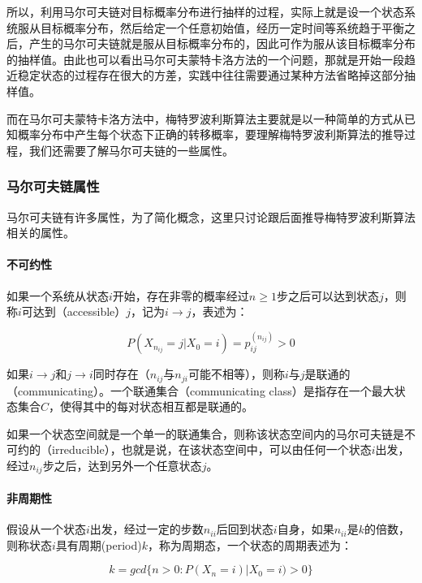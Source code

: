 所以，利用马尔可夫链对目标概率分布进行抽样的过程，实际上就是设一个状态系统服从目标概率分布，然后给定一个任意初始值，经历一定时间等系统趋于平衡之后，产生的马尔可夫链就是服从目标概率分布的，因此可作为服从该目标概率分布的抽样值。由此也可以看出马尔可夫蒙特卡洛方法的一个问题，那就是开始一段趋近稳定状态的过程存在很大的方差，实践中往往需要通过某种方法省略掉这部分抽样值。

而在马尔可夫蒙特卡洛方法中，梅特罗波利斯算法主要就是以一种简单的方式从已知概率分布中产生每个状态下正确的转移概率，要理解梅特罗波利斯算法的推导过程，我们还需要了解马尔可夫链的一些属性。




\subsubsection{马尔可夫链属性}
马尔可夫链有许多属性，为了简化概念，这里只讨论跟后面推导梅特罗波利斯算法相关的属性。


\paragraph{不可约性}
如果一个系统从状态$i$开始，存在非零的概率经过$n\geq 1$步之后可以达到状态$j$，则称$i$可达到（accessible）$j$，记为$i\rightarrow j$，表述为：

\begin{equation}
	P(X_{n_{ij}}=j|X_0=i)=p^{(n_{ij})}_{ij}>0
\end{equation}

如果$i\rightarrow j$和$j\rightarrow i$同时存在（$n_{ij}$与$n_{ji}$可能不相等），则称$i$与$j$是联通的（communicating）。一个联通集合（communicating class）是指存在一个最大状态集合$C$，使得其中的每对状态相互都是联通的。

如果一个状态空间就是一个单一的联通集合，则称该状态空间内的马尔可夫链是不可约的（irreducible），也就是说，在该状态空间中，可以由任何一个状态$i$出发，经过$n_{ij}$步之后，达到另外一个任意状态$j$。




\paragraph{非周期性}
假设从一个状态$i$出发，经过一定的步数$n_{ii}$后回到状态$i$自身，如果$n_{ii}$是$k$的倍数，则称状态$i$具有周期(period)$k$，称为周期态，一个状态的周期表述为：

\begin{equation}
	k=gcd\{n>0:P(X_n=i)|X_0=i)>0\}
\end{equation}

